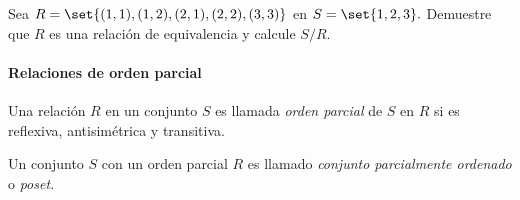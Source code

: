 	\begin{problema}
		\label{lip:exmp:2.13.b}
		Sea $R=\set{(1,1),(1,2),(2,1),(2,2),(3,3)}$ en $S=\set{1,2,3}.$ Demuestre que $R$ es una relación de equivalencia y calcule $S/R.$
	\end{problema}







\paragraph{Relaciones de orden parcial}


	Una relación $R$ en un conjunto $S$ es llamada \emph{orden parcial} de $S$ en $R$ si es reflexiva, antisim\'etrica y transitiva.

	Un conjunto $S$ con un orden parcial $R$ es llamado \emph{conjunto parcialmente ordenado} o \emph{poset.}